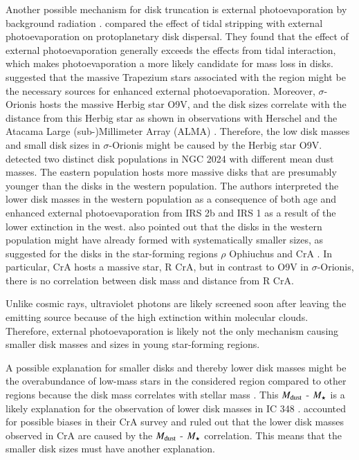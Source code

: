 \documentclass{aa}
\begin{document}
Another possible mechanism for disk truncation is external photoevaporation by background radiation \citep{StoerzerHollenbach1999,Armitage2000,Adams2010,Facchini2016,Haworth2018}. 
\citet{Winter2018}  compared the effect of tidal stripping with external photoevaporation on protoplanetary disk dispersal. 
They found that the effect of external photoevaporation generally exceeds the effects from tidal interaction, which makes photoevaporation a more likely candidate for mass loss in disks. 
 \citet{Eisner2018} suggested that the massive Trapezium stars associated with the region might be the necessary sources for enhanced external photoevaporation. 
Moreover, $\sigma$-Orionis hosts the massive Herbig star O9V, and the disk sizes correlate with the distance from this Herbig star as shown in observations with Herschel \citep{Mauco2016} and the Atacama Large (sub-)Millimeter Array (ALMA) \citep{Ansdell2017}. 
Therefore, the low disk masses and small disk sizes in $\sigma$-Orionis might be caused by the Herbig star O9V. 
\cite{vanTerwisga2020} detected two distinct disk populations in NGC 2024 with different mean dust masses. 
The eastern population hosts more massive disks that are presumably younger than the disks in the western population. 
The authors interpreted the lower disk masses in the western population as a consequence of both age and enhanced external photoevaporation from IRS 2b and IRS 1 as a result of the lower extinction in the west. 
\cite{vanTerwisga2020} also pointed out that the disks in the western population might have already formed with systematically smaller sizes, as suggested for the disks in the star-forming regions $\rho$ Ophiuchus \citep{Williams2019} and CrA \citep{Cazzoletti2019}.
In particular, CrA hosts a massive star, R CrA, but in contrast to O9V in $\sigma$-Orionis, there is no correlation between disk mass and distance from R CrA. 

Unlike cosmic rays, ultraviolet photons are likely screened soon after leaving the emitting source because of the high extinction within molecular clouds.
Therefore, external photoevaporation is likely not the only mechanism causing smaller disk masses and sizes in young star-forming regions.

A possible explanation for smaller disks and thereby lower disk masses might be the overabundance of low-mass stars in the considered region compared to other regions because the disk mass correlates with stellar mass \citep{Pascucci2016,Ansdell2017}.
This $M_{\rm dust}$ - $M_{\rm \star}$ is a likely explanation for the observation of lower disk masses in IC 348 \citep{Ruiz-Rodriguez2018}.
\citet{Cazzoletti2019} accounted for possible biases in their CrA survey and ruled out that the lower disk masses observed in CrA are caused by the $M_{\rm dust}$ - $M_{\rm \star}$ correlation. 
This means that the smaller disk sizes must have another explanation. 
\end{document}

